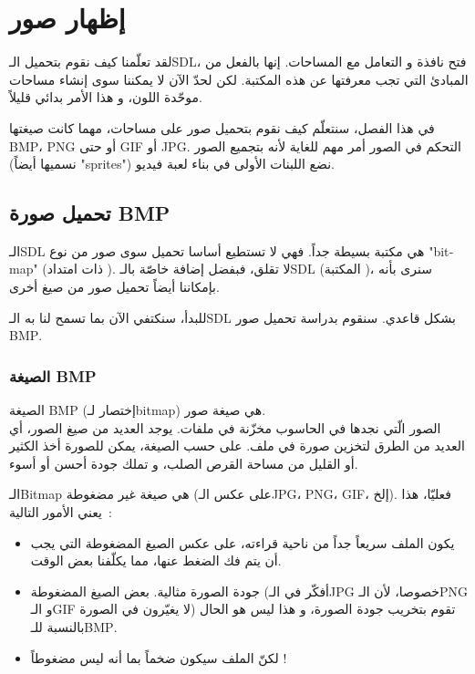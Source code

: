 \chapter{إظهار صور}

لقد تعلّمنا كيف نقوم بتحميل الـ\textenglish{SDL}،
فتح نافذة و التعامل مع المساحات. إنها بالفعل من المبادئ التي تجب معرفتها عن هذه المكتبة. لكن لحدّ الآن لا يمكننا سوى إنشاء مساحات موحّدة اللون، و هذا الأمر بدائي قليلاً.

في هذا الفصل، سنتعلّم كيف نقوم بتحميل صور على مساحات، مهما كانت صيغتها
\textenglish{BMP}،
\textenglish{PNG}
أو حتى 
\textenglish{GIF}
أو 
\textenglish{JPG}.
التحكم في الصور أمر مهم للغاية لأنه بتجميع الصور (نسميها أيضاً 
"\textenglish{sprites}")
نضع اللبنات الأولى في بناء لعبة فيديو.

\section{تحميل صورة \textenglish{BMP}}

الـ\textenglish{SDL}
هي مكتبة بسيطة جداً. فهي لا تستطيع أساسا تحميل سوى صور من نوع
"\textenglish{bitmap}"
(ذات امتداد
).
لا تقلق، فبفضل إضافة خاصّة بالـ\textenglish{SDL}
(المكتبة
)،
 سنرى بأنه بإمكاننا أيضاً تحميل صور من صيغ أخرى.
 
 للبدأ، سنكتفي الآن بما تسمح لنا به الـ\textenglish{SDL}
 بشكل قاعدي. سنقوم بدراسة تحميل صور
\textenglish{BMP}.

\subsection{الصيغة \textenglish{BMP}}

الصيغة
\textenglish{BMP}
(إختصار لـ\textenglish{bitmap})
هي صيغة صور.\\
الصور الّتي نجدها في الحاسوب مخزّنة في ملفات. يوجد العديد من صيغ الصور، أي العديد من الطرق لتخزين صورة في ملف. على حسب الصيغة، يمكن للصورة أخذ الكثير أو القليل من مساحة القرص الصلب، و تملك جودة أحسن أو أسوء.

الـ\textenglish{Bitmap}
هي صيغة غير مضغوطة (على عكس الـ\textenglish{JPG}، \textenglish{PNG}، \textenglish{GIF}،
إلخ).
فعليّا، هذا يعني الأمور التالية~:

\begin{itemize}
	\item يكون الملف سريعاً جداً من ناحية قراءته، على عكس الصيغ المضغوطة التي يجب أن يتم فك الضغط عنها، مما يكلّفنا بعض الوقت.
	\item جودة الصورة مثالية. بعض الصيغ المضغوطة (أفكّر في الـ\textenglish{JPG}
	خصوصا، لأن الـ\textenglish{PNG}
	و الـ\textenglish{GIF}
	لا يغيّرون في الصورة) تقوم بتخريب جودة الصورة، و هذا ليس هو الحال بالنسبة للـ\textenglish{BMP}.
	\item لكنّ الملف سيكون ضخماً بما أنه ليس مضغوطاً !
\end{itemize}

